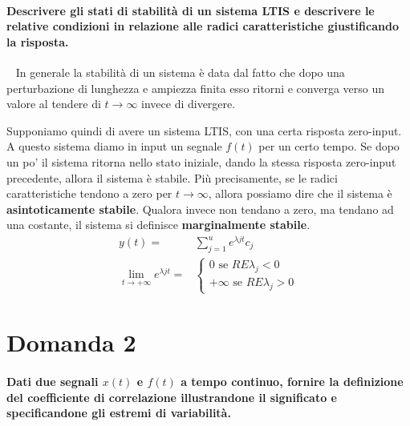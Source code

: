 \documentclass[a4paper,oneside]{scrbook}
\begin{document}
\paragraph{Descrivere gli stati di stabilità di un sistema LTIS e descrivere le relative condizioni in relazione alle radici caratteristiche giustificando la risposta.}\
\newline
In generale la stabilità di un sistema è data dal fatto che dopo una perturbazione di lunghezza e ampiezza finita esso ritorni e converga verso un valore al tendere
di $t \rightarrow \infty$ invece di divergere.

Supponiamo quindi di avere un sistema LTIS, con una certa risposta zero-input. A questo sistema diamo in input un segnale $f(t)$ per un certo tempo.
Se dopo un po' il sistema ritorna nello stato iniziale, dando la stessa risposta zero-input precedente, allora il sistema è stabile.
Più precisamente, se le radici caratteristiche tendono a zero per $t \rightarrow \infty$, allora possiamo dire
che il sistema è \textbf{asintoticamente stabile}. Qualora invece non tendano a zero, ma tendano ad una costante, il sistema si definisce \textbf{marginalmente stabile}.
\begin{align*}
	y(t)=&\sum_{j=1}^{u}e^{\lambda jt}c_j\\
	\lim_{t\rightarrow +\infty} e^{\lambda jt}=&\begin{cases}
													0 \text{ se } RE{\lambda_j<0}\\
													+\infty \text{ se } RE{\lambda_j>0}
												\end{cases}
\end{align*}

\section*{Domanda 2}
\paragraph{Dati due segnali $x(t)$ e $f(t)$ a tempo continuo, fornire la definizione del coefficiente di correlazione illustrandone il significato e specificandone gli estremi di variabilità.}\
\newline
\end{document}
